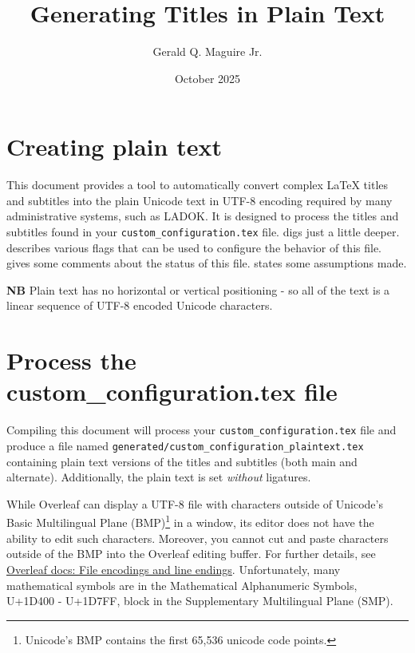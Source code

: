 \documentclass{article}
\title{Generating Titles in Plain Text}
\author{Gerald Q. Maguire Jr.}
\date{October 2025}
\begin{document}
\maketitle
\section{Creating plain text}
This document provides a tool to automatically convert complex \LaTeX{} titles and subtitles into the plain Unicode text in UTF-8 encoding required by many administrative systems, such as LADOK. It is designed to process the titles and subtitles found in your \texttt{custom\_configuration.tex} file. 
 digs just a little deeper.
 describes various flags that can be used to configure the behavior of this file.  gives some comments about the status of this file.  states some assumptions made. 

\textbf{NB} Plain text has no horizontal or vertical positioning - so all of the text is a linear sequence of UTF-8 encoded Unicode characters.

\section{Process the custom\_configuration.tex file}
\label{sec:customconfig}
Compiling this document will process your
\texttt{custom\_configuration.tex} file and produce a file named \texttt{generated/custom\_configuration\_plaintext.tex} containing plain text versions of the \mbox{titles} and subtitles (both main and alternate). Additionally, the plain text is set \textit{without} ligatures. 

While Overleaf can display a UTF-8 file with characters outside of Unicode's Basic Multilingual Plane (BMP)\footnote{Unicode's BMP contains the first 65,536 unicode code points.} in a window, its editor does not have the ability to edit such characters. Moreover, you cannot cut and paste characters outside of the BMP into the Overleaf editing buffer. For further details, see \href{https://docs.overleaf.com/troubleshooting-and-support/file-encodings-and-line-endings}{Overleaf docs: File encodings and line endings}. Unfortunately, many mathematical symbols are in the Mathematical Alphanumeric Symbols, U+1D400 - U+1D7FF, block in the Supplementary Multilingual Plane (SMP).
\end{document}
